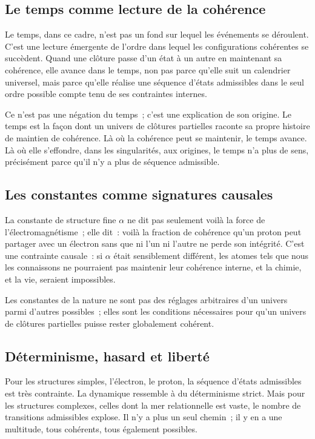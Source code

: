 \documentclass[12pt, a4paper, openright]{book}
\begin{document}
\subsection*{Le temps comme lecture de la cohérence}

Le temps, dans ce cadre, n'est pas un fond sur lequel les événements se déroulent. C'est une lecture émergente de l'ordre dans lequel les configurations cohérentes se succèdent. Quand une clôture passe d'un état à un autre en maintenant sa cohérence, elle \og avance dans le temps\fg{}, non pas parce qu'elle suit un calendrier universel, mais parce qu'elle réalise une séquence d'états admissibles dans le seul ordre possible compte tenu de ses contraintes internes.

\medskip

Ce n'est pas une négation du temps~; c'est une explication de son origine. Le temps est la façon dont un univers de clôtures partielles raconte sa propre histoire de maintien de cohérence. Là où la cohérence peut se maintenir, le temps avance. Là où elle s'effondre, dans les singularités, aux origines, le temps n'a plus de sens, précisément parce qu'il n'y a plus de séquence admissible.

\subsection*{Les constantes comme signatures causales}

La constante de structure fine $\alpha$ ne dit pas seulement \og voilà la force de l'électromagnétisme\fg{}~; elle dit~: \og voilà la fraction de cohérence qu'un proton peut partager avec un électron sans que ni l'un ni l'autre ne perde son intégrité\fg{}. C'est une contrainte causale~: si $\alpha$ était sensiblement différent, les atomes tels que nous les connaissons ne pourraient pas maintenir leur cohérence interne, et la chimie, et la vie, seraient impossibles.

\medskip

Les constantes de la nature ne sont pas des réglages arbitraires d'un univers parmi d'autres possibles~; elles sont les conditions nécessaires pour qu'un univers de clôtures partielles puisse rester globalement cohérent.

\subsection*{Déterminisme, hasard et liberté}

Pour les structures simples, l'électron, le proton, la séquence d'états admissibles est très contrainte. La dynamique ressemble à du déterminisme strict. Mais pour les structures complexes, celles dont la mer relationnelle est vaste, le nombre de transitions admissibles explose. Il n'y a plus un seul chemin~; il y en a une multitude, tous cohérents, tous également possibles.
\end{document}
